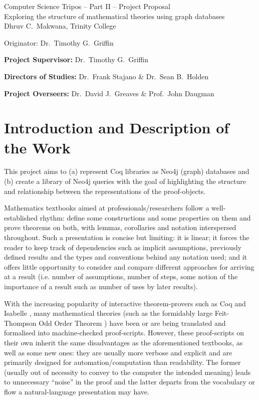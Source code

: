 \documentclass[12pt]{article}
\begin{document}
\begin{center}
\Large
Computer Science Tripos -- Part II -- Project Proposal\\[4mm]
\LARGE
Exploring the structure of mathematical theories using graph databases\\[4mm]

\large
Dhruv C.~Makwana, Trinity College

Originator: Dr.~Timothy G.~Griffin

\end{center}

\vspace{5mm}

\textbf{Project Supervisor:} Dr.~Timothy G.~Griffin

\textbf{Directors of Studies:} Dr.~Frank Stajano \& Dr.~Sean B.~Holden

\textbf{Project Overseers:} Dr.~David J.~Greaves  \& Prof.~John Daugman

\section*{Introduction and Description of the Work}
This project aims to (a) represent Coq libraries as Neo4j (graph) databases
and (b) create a library of Neo4j queries with the goal of highlighting
the structure and relationship between the representations of the proof-objects.

Mathematics textbooks aimed at professionals/researchers follow a well-established
rhythm: define some constructions and some properties on them and prove
theorems on both, with lemmas, corollaries and notation interspersed
throughout. Such a presentation is concise but limiting: it is linear; it forces
the reader to keep track of dependencies such as implicit assumptions, previously
defined results and the types and conventions behind any notation used;
and it offers little opportunity to consider and compare different approaches
for arriving at a result (i.e. number of assumptions, number of steps, some
notion of the importance of a result such as number of uses by later
results).

With the increasing popularity of interactive theorem-provers such as Coq
\cite{Coq:manual} and Isabelle \cite{nipkow2002isabelle}, many mathematical theories
(such as the formidably large Feit-Thompson Odd Order Theorem
\cite{peterfalvi2000oot, bender1994oot}) have been \cite{gonthier2013oot} or are being
translated and formalised into machine-checked proof-scripts. However, these
proof-scripts on their own inherit the same disadvantages as the aforementioned
textbooks, as well as some new ones: they are usually more verbose and explicit
and are primarily designed for automation/computation than readability. The
former (usually out of necessity to convey to the computer the intended
meaning) leads to unnecessary ``noise'' in the proof and the latter departs
from the vocabulary or flow a natural-language presentation may have.
\end{document}

